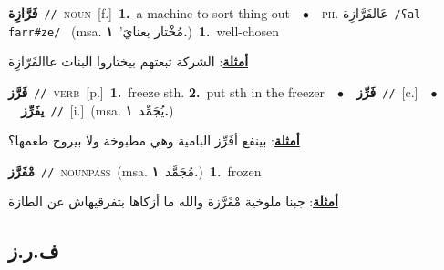 \documentclass[10pt,a4paper,twoside]{article} %
\begin{document}
\begin{multicols}{2}
{\setlength\topsep{0pt}\textbf{\foreignlanguage{arabic}{فَرَّازِة}}\ {\color{gray}\texttt{//}\color{black}}\ \textsc{noun}\ [f.]\ \textbf{1.}~a machine to sort thing out\ \ $\bullet$\ \ \textsc{ph.} \color{gray} \foreignlanguage{arabic}{عَالفَرَّازِة}\color{black}\ {\color{gray}\texttt{/{\sffamily ʕal farr\#ze}/}\color{black}}\ \color{gray} (msa. \foreignlanguage{arabic}{مُخْتار بعنايَ’}~\foreignlanguage{arabic}{\textbf{١.}})\color{black}\ \textbf{1.}~well-chosen\  \begin{flushright}\color{gray}\foreignlanguage{arabic}{\textbf{\underline{\foreignlanguage{arabic}{أمثلة}}}: الشركة تبعتهم بيختاروا البنات عاالفَرّازِة}\end{flushright}\color{black}} \vspace{2mm}

{\setlength\topsep{0pt}\textbf{\foreignlanguage{arabic}{فَرَّز}}\ {\color{gray}\texttt{//}\color{black}}\ \textsc{verb}\ [p.]\ \textbf{1.}~freeze sth.  \textbf{2.}~put sth in the freezer\ \ $\bullet$\ \ \setlength\topsep{0pt}\textbf{\foreignlanguage{arabic}{فَرِّز}}\ {\color{gray}\texttt{//}\color{black}}\ [c.]\ \ $\bullet$\ \ \setlength\topsep{0pt}\textbf{\foreignlanguage{arabic}{يفَرِّز}}\ {\color{gray}\texttt{//}\color{black}}\ [i.]\ \color{gray}(msa. \foreignlanguage{arabic}{يُجَمِّد}~\foreignlanguage{arabic}{\textbf{١.}})\color{black}\  \begin{flushright}\color{gray}\foreignlanguage{arabic}{\textbf{\underline{\foreignlanguage{arabic}{أمثلة}}}: بينفع أفَرِّز البامية وهي مطبوخة ولا بيروح طعمها؟}\end{flushright}\color{black}} \vspace{2mm}

{\setlength\topsep{0pt}\textbf{\foreignlanguage{arabic}{مْفَرَّز}}\ {\color{gray}\texttt{//}\color{black}}\ \textsc{noun\textunderscore pass}\ \color{gray}(msa. \foreignlanguage{arabic}{مُجَمَّد}~\foreignlanguage{arabic}{\textbf{١.}})\color{black}\ \textbf{1.}~frozen\  \begin{flushright}\color{gray}\foreignlanguage{arabic}{\textbf{\underline{\foreignlanguage{arabic}{أمثلة}}}: جبنا ملوخية مْفَرَّزة والله ما أزكاها بتفرقيهاش عن الطازة}\end{flushright}\color{black}} \vspace{2mm}

\vspace{-3mm}
\subsection*{\color{blue}\foreignlanguage{arabic}{ف.ر.ز}\color{blue}{ (ntws)}} 


\end{multicols}
\end{document}
